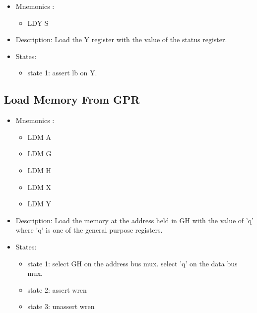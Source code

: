 \documentclass[a4paper,12pt]{article}
\begin{document}
\begin{itemize}
\item Mnemonics :
\begin{itemize}
	\item LDY S
\end{itemize}
\item Description: Load the Y register with the value of the status register.
\item States:
\begin{itemize}
	\item state 1: assert lb on Y.
\end{itemize}
\end{itemize}

\subsection{Load Memory From GPR}
\begin{itemize}
\item Mnemonics :
\begin{itemize}
	\item LDM A
	\item LDM G
	\item LDM H
	\item LDM X
	\item LDM Y
\end{itemize}
\item Description: Load the memory at the address held in GH with the value of 'q' where 'q' is one of the general purpose registers.
\item States:
\begin{itemize}
	\item state 1: select GH on the address bus mux. select 'q' on the data bus mux.
	\item state 2: assert wren
	\item state 3: unassert wren
\end{itemize}
\end{itemize}
\end{document}
